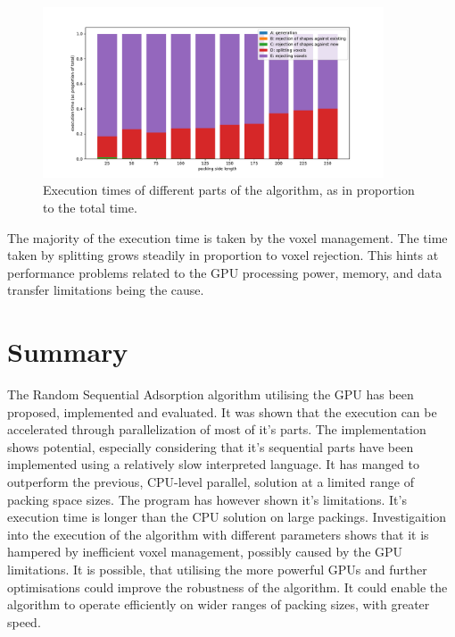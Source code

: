 \documentclass[12pt, oneside]{report}
\begin{document}
\begin{figure}[H]
  \centering
	\includegraphics[width=0.9\textwidth,keepaspectratio]{Images/SummaryComparison/parts_proportional.pdf}
	\caption{Execution times of different parts of the algorithm, as in proportion to the total time.}
	\label{summary_times_proportional}
\end{figure}

The majority of the execution time is taken by the voxel management. The time taken by splitting grows steadily in proportion to voxel rejection. This hints at performance problems related to the GPU processing power, memory, and data transfer limitations being the cause.


\section{Summary}

The Random Sequential Adsorption algorithm utilising the GPU has been proposed, implemented and evaluated. It was shown that the execution can be accelerated through parallelization of most of it's parts. The implementation shows potential, especially considering that it's sequential parts have been implemented using a relatively slow interpreted language. It has manged to outperform the previous, CPU-level parallel, solution at a limited range of packing space sizes. \newline
The program has however shown it's limitations. It's execution time is longer than the CPU solution on large packings. Investigaition into the execution of the algorithm with different parameters shows that it is hampered by inefficient voxel management, possibly caused by the GPU limitations. It is possible, that utilising the more powerful GPUs and further optimisations could improve the robustness of the algorithm. It could enable the algorithm to operate efficiently on wider ranges of packing sizes, with greater speed.


\newpage
\printbibliography
\end{document}
